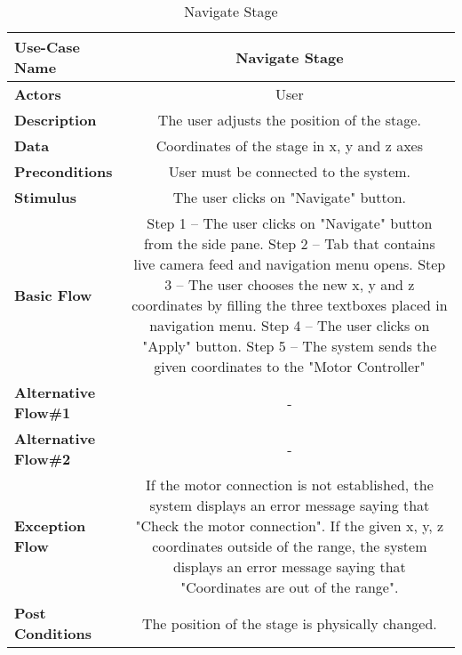 \begin{table}[H]
     \centering
     \begin{tabular}{|l|C|}
         \hline
          \textbf{Use-Case Name} & Navigate Stage \\
         \hline
          \textbf{Actors} & User \\ 
         \hline
          \textbf{Description} & The user adjusts the position of the stage. \\ 
         \hline
          \textbf{Data} & Coordinates of the stage in x, y and z axes\\ 
         \hline
          \textbf{Preconditions} & 
          User must be connected to the system. \\
         \hline
          \textbf{Stimulus} & The user clicks on "Navigate" button.\\ 
         \hline
          \textbf{Basic Flow} & 
          Step 1 -- The user clicks on "Navigate" button from the side pane. \newline
          Step 2 -- Tab that contains live camera feed and navigation menu opens. \newline
          Step 3 -- The user chooses the new x, y and z coordinates by filling the three textboxes placed in navigation menu. \newline
		  Step 4 -- The user clicks on "Apply" button. \newline
		  Step 5 -- The system sends the given coordinates to the "Motor Controller" \\
         \hline
          \textbf{Alternative Flow\#1} & - \\
         \hline
          \textbf{Alternative Flow\#2} & - \\
         \hline
          \textbf{Exception Flow} & If the motor connection is not established, the system displays an error message saying that "Check the motor connection". If the given x, y, z coordinates outside of the range, the system displays an error message saying that "Coordinates are out of the range".\\
         \hline
          \textbf{Post Conditions} & The position of the stage is physically changed. \\ 
         \hline
     \end{tabular}
     \caption{Navigate Stage}
     \label{tab:navigate_stage}
 \end{table}